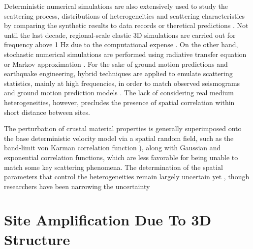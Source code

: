 Deterministic numerical simulations are also extensively used to study the scattering process, distributions of heterogeneities and scattering characteristics by comparing the synthetic results to data records or theretical predictions \citep{frankelFiniteDifferenceSimulations1986,rothSingleScatteringTheory1993,shapiroSeismicAttenuationScattering1993,thyboSeismicScatteringTop2003}. Not until the last decade, regional-scale elastic 3D simulations are carried out for frequency above 1 Hz due to the computational expense \citep{hartzellEffects3DRandom2010,pitarka2009simulating}. On the other hand, stochastic numerical simulations are performed using radiative transfer equation \citep{gusevSimulatedEnvelopesNonisotropically1996,przybillaRadiativeTransferElastic2006} or Markov approximation \citep{saitoEnvelopeBroadeningSpherically2002,sawazakiEnvelopeSynthesisShortperiod2011}. For the sake of ground motion predictions and earthquake engineering, hybrid techniques are applied to emulate scattering statistics, mainly at high frequencies, in order to match observed seismograms and ground motion prediction models \citep{liuPredictionBroadbandGroundMotion2006,gravesBroadbandGroundMotionSimulation2010, maiHybridBroadbandGroundMotion2010}. The lack of considering real medium heterogeneities, however, precludes the presence of spatial correlation within short distance between sites.

The perturbation of crustal material properties is generally superimposed onto the base deterministic velocity model via a spatial random field, such as the band-limit von Karman correlation function \citep[][\cref{app:A}]{frankelFiniteDifferenceSimulations1986,hartzellEffects3DRandom2010}), along with Gaussian and exponential correlation functions, which are less favorable for being unable to match some key scattering phenomena. The determination of the spatial parameters that control the heterogeneities remain largely uncertain yet , though researchers have been narrowing the uncertainty \citep{thyboSeismicScatteringTop2003,nielsenIdentificationCrustalUpper2006, przybillaEstimationCrustalScattering2009, imperatoriBroadbandNearfieldGround2013, imperatoriRoleTopographyLateral2015}


\section{Site Amplification Due To 3D Structure}

